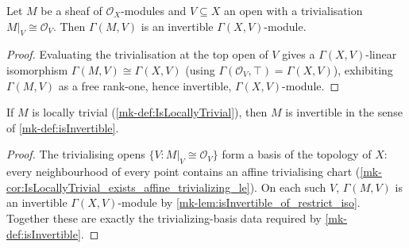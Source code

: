 \begin{lemma}
  \label{mk-lem:isInvertible_of_restrict_iso}
  \leanok
  Let \(M\) be a sheaf of \(\mathcal{O}_X\)-modules and \(V \subseteq X\)
  an open with a trivialisation \(M|_V \cong \mathcal{O}_V\). Then
  \(\Gamma(M, V)\) is an invertible \(\Gamma(X, V)\)-module.
\end{lemma}
\begin{proof}
  \leanok
  Evaluating the trivialisation at the top open of \(V\) gives a
  \(\Gamma(X,V)\)-linear isomorphism \(\Gamma(M, V) \cong \Gamma(X, V)\)
  (using \(\Gamma(\mathcal{O}_V, \top) = \Gamma(X, V)\)), exhibiting
  \(\Gamma(M,V)\) as a free rank-one, hence invertible, \(\Gamma(X,V)\)-module.
\end{proof}

\begin{theorem}
  \label{mk-thm:isLocallyTrivial_isInvertibleGr}
  \leanok
  If \(M\) is locally trivial (\ref{mk-def:IsLocallyTrivial}), then \(M\)
  is invertible in the sense of \ref{mk-def:isInvertible}.
\end{theorem}
\begin{proof}
  \leanok
  The trivialising opens \(\{V : M|_V \cong \mathcal{O}_V\}\) form a
  basis of the topology of \(X\): every neighbourhood of every point
  contains an affine trivialising chart
  (\ref{mk-cor:IsLocallyTrivial_exists_affine_trivializing_le}). On each
  such \(V\), \(\Gamma(M,V)\) is an invertible \(\Gamma(X,V)\)-module by
  \ref{mk-lem:isInvertible_of_restrict_iso}. Together these are exactly
  the trivializing-basis data required by \ref{mk-def:isInvertible}.
\end{proof}

